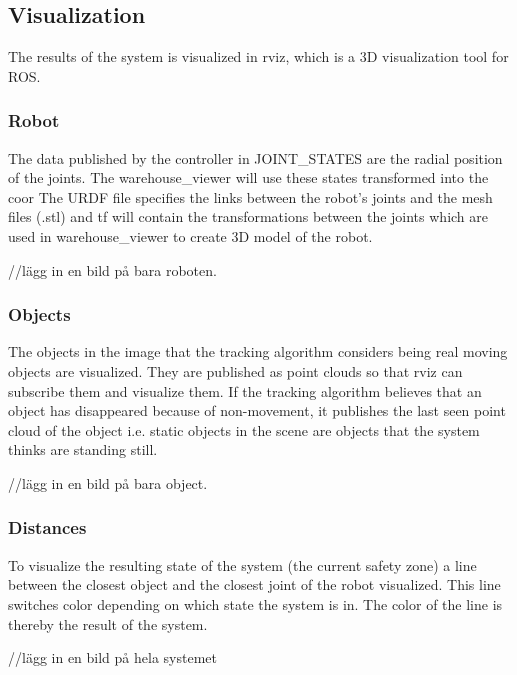 \subsection{Visualization}

The results of the system is visualized in rviz, which is a 3D visualization tool for ROS. 

\subsubsection{Robot}
The data published by the controller in JOINT\_STATES are the radial position of the joints. The warehouse\_viewer will use these states transformed into the coor The URDF file specifies the links between the robot’s joints and the mesh files (.stl) and tf will contain the transformations between the joints which are used in warehouse\_viewer to create 3D model of the robot. 

//lägg in en bild på bara roboten.

\subsubsection{Objects}
The objects in the image that the tracking algorithm considers being real moving objects are visualized. They are published as point clouds so that rviz can subscribe them and visualize them. If the tracking algorithm believes that an object has disappeared because of non-movement, it publishes the last seen point cloud of the object i.e. static objects in the scene are objects that the system thinks are standing still. 

//lägg in en bild på bara object. 

\subsubsection{Distances}
To visualize the resulting state of the system (the current safety zone) a line between the closest object and the closest joint of the robot visualized. This line switches color depending on which state the system is in. The color of the line is thereby the result of the system. 

//lägg in en bild på hela systemet

